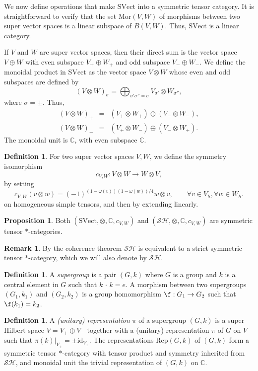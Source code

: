 \documentclass[11pt]{article}
\theoremstyle{definition}
\newtheorem{prop}[thm]{Proposition}
\theoremstyle{definition}
\newtheorem{defn}[thm]{Definition}
\newtheorem{note}[thm]{Remark}
\theoremstyle{remark}
\newcommand{\SVect}{\mathrm{SVect}}
\newcommand{\gp}{\,\cdot \,}
\def\2#1{{\mathcal #1}}
\def\7#1{{\mathbb #1}}
\def\om{\omega} \def\Om{\Omega} \def\dd{\partial} \def\D{\Delta}
\newcommand{\Mor}{\mathrm{Mor}}
\newcommand{\Rep}{\mathrm{Rep}}
\def\id{\mathrm{id}}
\begin{document}
We now define operations that make $\SVect$ into a
symmetric tensor category.  It is straightforward to
verify that the set $\Mor (V,W)$ of morphisms between
two super vector spaces is a linear subspace of
$B(V,W)$.  Thus, $\SVect$ is a linear category.

If $V$ and $W$ are super vector spaces, then their
direct sum is the vector space $V\oplus W$ with even
subspace $V_+\oplus W_+$ and odd subspace $V_-\oplus
W_-$.  We define the monoidal product in $\SVect$ as
the vector space $V\otimes W$ whose even and odd
subspaces are defined by
\[ (V\otimes W)_{\sigma }=\bigoplus _{\sigma '\sigma
  ''=\sigma}V_{\sigma '}\otimes W_{\sigma ''} ,\] where
$\sigma =\pm$.  Thus,
\begin{eqnarray*} (V\otimes W)_+ &=& (V_+\otimes W_+)\oplus (V_-\otimes W_-)  ,\\
  (V\otimes W)_- &=& (V_+\otimes W_-)\oplus (V_-\otimes
  W_+) .\end{eqnarray*} The monoidal unit is $\7C$,
with even subspace $\7C$.

\begin{defn} For two super vector spaces $V,W$, we
  define the symmetry isomorphism
  \[ c_{V,W}:V\otimes W\to W\otimes V ,\] by setting
  \[ c_{V,W}(v\otimes w)=(-1)^{(1-\om (v))(1-\om
    (w))/4} w\otimes v ,\qquad \forall v\in V_h,\forall
  w\in W_h. \] on homogeneous simple tensors, and then
  by extending linearly.
\end{defn}

\begin{prop} Both $(\SVect ,\otimes ,\7C,c_{V,W})$ and $(\2S\2H ,\otimes ,\7C
  ,c_{V,W})$ are symmetric tensor $*$-categories.
\end{prop}

\begin{note} By the coherence theorem $\2S\2H$ is equivalent to a strict symmetric
  tensor $*$-category, which we will also denote by $\2S\2H$.  
\end{note}

\begin{defn} A \emph{supergroup} is a pair $(G ,k )$ where $G$ is a group and $k$ is
  a central element in $G$ such that $k\gp k=e$.  A morphism between two supergroups
  $(G _1,k _1)$ and $(G _2,k_2)$ is a group homomorphism $\f:G _1\to G_2$ such that
  $\f(k_1)=k_2$.
\end{defn}

\begin{defn} A \emph{(unitary) representation} $\pi$ of
  a supergroup $(G,k)$ is a super Hilbert space
  $V=V_+\oplus V_-$ together with a (unitary)
  representation $\pi$ of $G$ on $V$ such that
  $\pi(k)|_{V_\pm}=\pm \id _{V_{\pm}}$.  The
  representations $\Rep (G,k)$ of $(G,k)$ form a
  symmetric tensor $*$-category with tensor product and
  symmetry inherited from $\2S\2H$, and monoidal unit
  the trivial representation of $(G,k)$ on
  $\7C$.  \end{defn}
\end{document}
